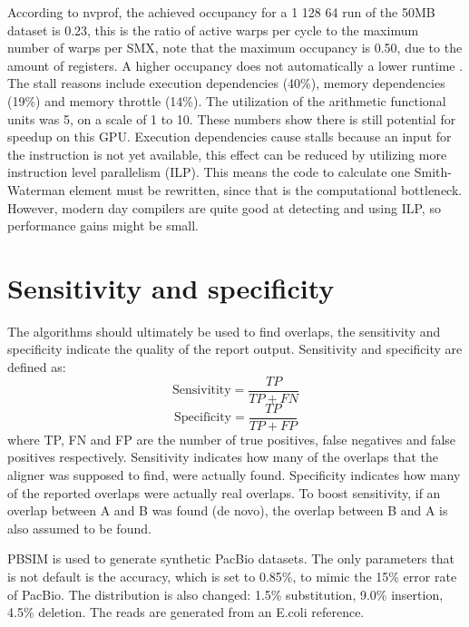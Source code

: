 \documentclass[../thesis.tex]{subfiles}
\begin{document}
According to nvprof, the achieved occupancy for a 1 128 64 run of the 50MB dataset is 0.23, this is the ratio of active warps per cycle to the maximum number of warps per SMX, note that the maximum occupancy is 0.50, due to the amount of registers.
A higher occupancy does not automatically a lower runtime \cite{low_occupancy}.
The stall reasons include execution dependencies (40\%), memory dependencies (19\%) and memory throttle (14\%).
The utilization of the arithmetic functional units was 5, on a scale of 1 to 10.
These numbers show there is still potential for speedup on this GPU.
Execution dependencies cause stalls because an input for the instruction is not yet available, this effect can be reduced by utilizing more instruction level parallelism (ILP).
This means the code to calculate one Smith-Waterman element must be rewritten, since that is the computational bottleneck.
However, modern day compilers are quite good at detecting and using ILP, so performance gains might be small.



\section{Sensitivity and specificity}
The algorithms should ultimately be used to find overlaps, the sensitivity and specificity indicate the quality of the report output.
Sensitivity and specificity are defined as:
$$\text{Sensivitity} = \frac{TP}{TP + FN}$$
$$\text{Specificity} = \frac{TP}{TP + FP}$$
where TP, FN and FP are the number of true positives, false negatives and false positives respectively.
Sensitivity indicates how many of the overlaps that the aligner was supposed to find, were actually found.
Specificity indicates how many of the reported overlaps were actually real overlaps.
To boost sensitivity, if an overlap between A and B was found (de novo), the overlap between B and A is also assumed to be found.

PBSIM \cite{PBSIM} is used to generate synthetic PacBio datasets.
The only parameters that is not default is the accuracy, which is set to 0.85\%, to mimic the 15\% error rate of PacBio.
The distribution is also changed: 1.5\% substitution, 9.0\% insertion, 4.5\% deletion.
The reads are generated from an E.coli reference.
\end{document}
